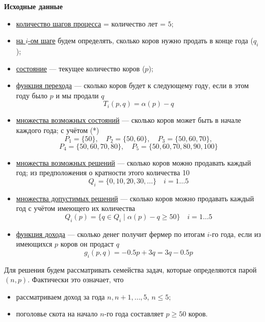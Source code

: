\bigskip

\textbf{Исходные данные}

\begin{itemize}[nosep]
	\item \underline{количество шагов процесса} = количество лет = $5$;
	
	\item \underline{на $i$-ом шаге} будем определять, сколько коров нужно продать в конце года ($q_i$);
	
	\item \underline{состояние} --- текущее количество коров ($p$);
	
	\item \underline{функция перехода} --- сколько коров будет к следующему году, если в этом году было $p$ и мы продали $q$
	\[T_i(p, q) = \alpha(p) - q\]
	
	\item \underline{множества возможных состояний} --- сколько коров может быть в начале каждого года; с учётом (*)
	\[
	P_1 = \{50\}, \quad P_2 = \{50, 60\}, \quad P_3 = \{50, 60, 70\},
	\]
	\[
	P_4 = \{50, 60, 70, 80\}, \quad P_5 = \{50, 60, 70, 80, 90, 100\}
	\]
	
	\item \underline{множества возможных решений} --- сколько коров можно продавать каждый год; из предположения о кратности этого количества 10
	\[
	Q_i = \{0, 10, 20, 30, \dots\} \quad i = 1 \dots 5
	\]
	
	\item \underline{множества допустимых решений} --- сколько коров можно продавать каждый год с учётом имеющего их количества
	\[
	Q_i(p) = \{q \in Q_i \; \big| \; \alpha(p) - q \ge 50\} \quad i = 1 \dots 5
	\]
	
	\item \underline{функция дохода} --- сколько денег получит фермер по итогам $i$-го года, если из имеющихся $p$ коров он продаст $q$
	\[g_i(p, q) = -0.5p + 3q = 3q - 0.5p\]
\end{itemize}

Для решения будем рассматривать семейства задач, которые определяются парой $(n, p)$. Фактически это означает, что
\begin{itemize}[nosep]
	\item рассматриваем доход за года $n, n+1, \dots, 5$, $n \le 5$;
	
	\item поголовье скота на начало $n$-го года составляет $p \ge 50$ коров.
\end{itemize}

